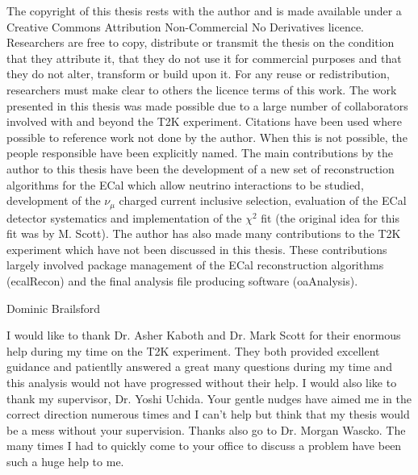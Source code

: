 \begin{declaration}
The copyright of this thesis rests with the author and is made available under a Creative Commons Attribution Non-Commercial No Derivatives licence. Researchers are free to copy, distribute or transmit the thesis on the condition that they attribute it, that they do not use it for commercial purposes and that they do not alter, transform or build upon it. For any reuse or redistribution, researchers must make clear to others the licence terms of this work.
\newline
\newline
The work presented in this thesis was made possible due to a large number of collaborators involved with and beyond the T2K experiment.  Citations have been used where possible to reference work not done by the author.  When this is not possible, the people responsible have been explicitly named.
\newline
\newline
The main contributions by the author to this thesis have been the development of a new set of reconstruction algorithms for the ECal which allow neutrino interactions to be studied, development of the $\nu_\mu$ charged current inclusive selection, evaluation of the ECal detector systematics and implementation of the $\chi^2$ fit (the original idea for this fit was by M. Scott).
\newline
\newline
The author has also made many contributions to the T2K experiment which have not been discussed in this thesis.  These contributions largely involved package management of the ECal reconstruction algorithms (ecalRecon) and the final analysis file producing software (oaAnalysis).
  \vspace*{1cm}
  \begin{flushright}
    Dominic Brailsford
  \end{flushright}
\end{declaration}


\begin{acknowledgements}
I would like to thank Dr. Asher Kaboth and Dr. Mark Scott for their enormous help during my time on the T2K experiment.  They both provided excellent guidance and patientlly answered a great many questions during my time and this analysis would not have progressed without their help.
\newline
\newline
I would also like to thank my supervisor, Dr. Yoshi Uchida.  Your gentle nudges have aimed me in the correct direction numerous times and I can't help but think that my thesis would be a mess without your supervision.
\newline
\newline
Thanks also go to Dr. Morgan Wascko.  The many times I had to quickly come to your office to discuss a problem have been such a huge help to me.

\end{acknowledgements}


